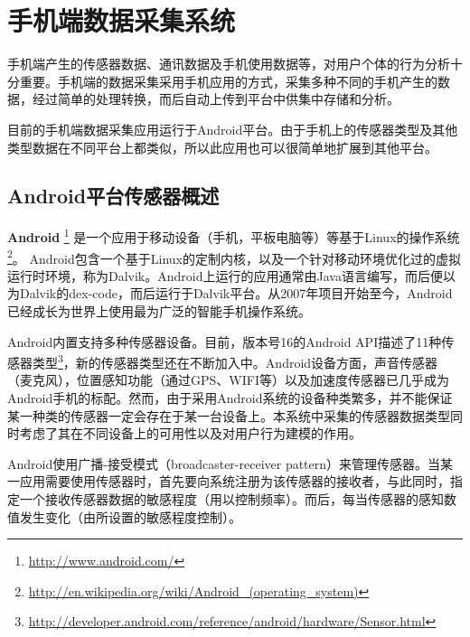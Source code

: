 \section{手机端数据采集系统}
\label{system:sec:collect}

手机端产生的传感器数据、通讯数据及手机使用数据等，对用户个体的行为分析十分重要。手机端的数据采集采用手机应用的方式，采集多种不同的手机产生的数据，经过简单的处理转换，而后自动上传到平台中供集中存储和分析。

目前的手机端数据采集应用运行于Android平台。由于手机上的传感器类型及其他类型数据在不同平台上都类似，所以此应用也可以很简单地扩展到其他平台。

\subsection{Android平台传感器概述}
\label{system:sec:AndroidPlatformSensors}

\textbf{Android} \footnote{\url{http://www.android.com/}} 是一个应用于移动设备（手机，平板电脑等）等基于Linux的操作系统\footnote{\url{http://en.wikipedia.org/wiki/Android_(operating_system)}}。
Android包含一个基于Linux的定制内核，以及一个针对移动环境优化过的虚拟运行时环境，称为Dalvik。Android上运行的应用通常由Java语言编写，而后便以为Dalvik的dex-code，而后运行于Dalvik平台。从2007年项目开始至今，Android已经成长为世界上使用最为广泛的智能手机操作系统。 

Android内置支持多种传感器设备。目前，版本号16的Android API描述了11种传感器类型\footnote{\url{http://developer.android.com/reference/android/hardware/Sensor.html}}，新的传感器类型还在不断加入中。Android设备方面，声音传感器（麦克风），位置感知功能（通过GPS、WIFI等）以及加速度传感器已几乎成为Android手机的标配。然而，由于采用Android系统的设备种类繁多，并不能保证某一种类的传感器一定会存在于某一台设备上。本系统中采集的传感器数据类型同时考虑了其在不同设备上的可用性以及对用户行为建模的作用。

Android使用广播-接受模式（broadcaster-receiver pattern）来管理传感器。当某一应用需要使用传感器时，首先要向系统注册为该传感器的接收者，与此同时，指定一个接收传感器数据的敏感程度（用以控制频率）。而后，每当传感器的感知数值发生变化（由所设置的敏感程度控制）\cite{sensorevent}。


